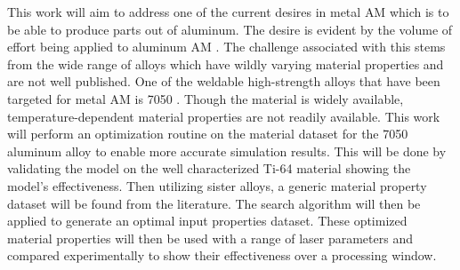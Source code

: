 This work will aim to address one of the current desires in metal \ac{AM} which is to be able to produce parts out of aluminum.  The desire is evident by the volume of effort being applied to aluminum \ac{AM} \cite{qiHighStrengthLi2020, weissImprovedHighTemperatureAluminum2019, weissDevelopmentsAluminumScandiumCeramicAluminumScandiumCerium2019}.  The challenge associated with this stems from the wide range of alloys which have wildly varying material properties and are not well published.  One of the weldable high-strength alloys that have been targeted for metal \ac{AM} is 7050 \cite{singhAdditiveManufacturing4047}.  Though the material is widely available, temperature-dependent material properties are not readily available.  
This work will perform an optimization routine on the material dataset for the 7050 aluminum alloy to enable more accurate simulation results.  This will be done by validating the model on the well characterized Ti-64 material showing the model's effectiveness.  Then utilizing sister alloys, a generic material property dataset will be found from the literature.  The search algorithm will then be applied to generate an optimal input properties dataset.  These optimized material properties will then be used with a range of laser parameters and compared experimentally to show their effectiveness over a processing window.



